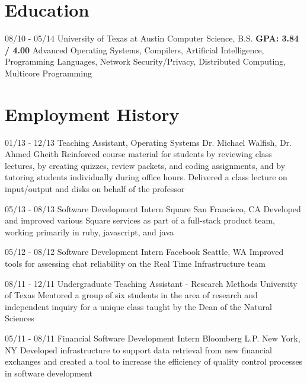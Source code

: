 \documentclass[11pt,letter,sans]{moderncv}
\begin{document}
\maketitle

\section{Education}
\cventry
{08/10 - 05/14}
{University of Texas at Austin}
{Computer Science, B.S. \textbf{GPA: 3.84 / 4.00}}
{}
{}
{}
{Advanced Operating Systems, Compilers, Artificial Intelligence, Programming
Languages, Network Security/Privacy, Distributed Computing, Multicore
Programming}

\section{Employment History}
\cventry
{01/13 - 12/13}
{Teaching Assistant, Operating Systems}
{Dr. Michael Walfish, Dr. Ahmed Gheith}
{}
{}
{Reinforced course material for students by reviewing class lectures, by
creating quizzes, review packets, and coding assignments, and by tutoring
students individually during office hours. Delivered a class lecture on
input/output and disks on behalf of the professor}

\cventry
{05/13 - 08/13}
{Software Development Intern}
{Square}
{San Francisco, CA}
{}
{Developed and improved various Square services as part of a full-stack product
team, working primarily in ruby, javascript, and java}

\cventry
{05/12 - 08/12}
{Software Development Intern}
{Facebook}
{Seattle, WA}
{}
{Improved tools for assessing chat reliability on the Real Time Infrastructure team}


\cventry
{08/11 - 12/11}
{Undergraduate Teaching Assistant - Research Methods}
{University of Texas}
{}
{}
{Mentored a group of six students in the area of research and independent
inquiry for a unique class taught by the Dean of the Natural
Sciences}

\cventry
{05/11 - 08/11}
{Financial Software Development Intern}
{Bloomberg L.P.}
{New York, NY}
{}
{Developed infrastructure to support data retrieval from new financial
exchanges and created a tool to increase the efficiency of quality control
processes in software development}
\end{document}
